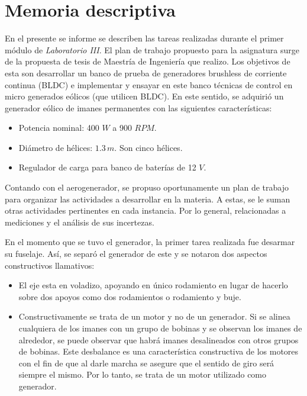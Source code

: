 \documentclass[a4paper,11pt,twoside]{IT-CNEA}
\begin{document}
    \portada
    
    \tableofcontents   
    
    \printnomenclature[2cm]



\newpage  
\section{Memoria descriptiva}
En el presente se informe se describen las tareas realizadas durante el primer módulo de \textit{Laboratorio III}. El plan de trabajo propuesto para la asignatura surge de la propuesta de tesis de Maestría de Ingeniería que realizo. Los objetivos de esta son desarrollar un banco de prueba de generadores brushless de corriente continua (BLDC) e implementar y ensayar en este banco técnicas de control en micro generados eólicos (que utilicen BLDC). En este sentido, se adquirió un generador eólico de imanes permanentes con las siguientes características:
\begin{itemize}
\item Potencia nominal: 400 $W$ a 900 $RPM$.
\item Diámetro de hélices: $1.3\,m$. Son cinco hélices.
\item Regulador de carga para banco de baterías de 12 $V$.
\end{itemize} 
Contando con el aerogenerador, se propuso oportunamente un plan de trabajo para organizar las actividades a desarrollar en la materia. A estas, se le suman otras actividades pertinentes en cada instancia. Por lo general, relacionadas a mediciones y el análisis de sus incertezas.
\par En el momento que se tuvo el generador, la primer tarea realizada fue desarmar su fuselaje. Así, se separó el generador de este y se notaron dos aspectos constructivos llamativos:
\begin{itemize}
\item El eje esta en voladizo, apoyando en único rodamiento en lugar de hacerlo sobre dos apoyos como dos rodamientos o rodamiento y buje. 
\item Constructivamente se trata de un motor y no de un generador. Si se alinea cualquiera de los imanes con un grupo de bobinas y se observan los imanes de alrededor, se puede observar que habrá imanes desalineados con otros grupos de bobinas. Este desbalance es una característica constructiva de los motores con el fin de que al darle marcha se asegure que el sentido de giro será siempre el mismo. Por lo tanto, se trata de un motor utilizado como generador.
\end{itemize}   
\end{document}
